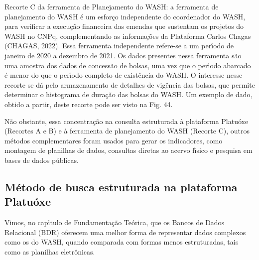 \documentclass[
12pt,		%
openright,	%
twoside,  %
a4paper,			%
chapter=TITLE,		%
english,			%
french,				%
spanish,			%
brazil				%
]{USPSC-classe/USPSC}
\begin{document}
\begin{alineas}
\item Recorte C da ferramenta de Planejamento do WASH: a ferramenta de planejamento do WASH \'e um esfor\c{c}o independente do coordenador do WASH, para verificar a execu\c{c}\~ao financeira das emendas que sustentam os projetos do WASH no CNPq, complementando as informa\c{c}\~oes da Plataforma Carlos Chagas  (CHAGAS, 2022). Essa ferramenta independente refere-se a um per\'{\i}odo de janeiro de 2020 a dezembro de 2021. Os dados presentes nessa ferramenta s\~ao uma amostra dos dados de concess\~ao de bolsas, uma vez que o per\'{\i}odo abarcado \'e menor do que o per\'{\i}odo completo de exist\^encia do WASH. O interesse nesse recorte se d\'a pelo armazenamento de detalhes de vig\^encia das bolsas, que permite determinar o histograma de dura\c{c}\~ao das bolsas do WASH. Um exemplo de dado, obtido a partir, deste recorte pode ser visto na Fig. 44.
\end{alineas}

N\~ao obstante, essa concentra\c{c}\~ao na consulta estruturada \`a plataforma Platu\'oxe (Recortes A e B) e \`a ferramenta de planejamento do WASH (Recorte C), outros m\'etodos complementares foram usados para gerar os indicadores, como montagem de planilhas de dados, consultas diretas ao acervo f\'{\i}sico e pesquisa em bases de dados p\'ublicas.

















\subsection[M\'etodo de busca estruturada na plataforma Platu\'oxe]{M\'etodo de busca estruturada na plataforma Platu\'oxe}\label{M\'etodo de busca estruturada na plataforma Platu\'oxe}
Vimos, no cap\'{\i}tulo de Fundamenta\c{c}\~ao Te\'orica, que os Bancos de Dados Relacional (BDR) oferecem uma melhor forma de representar dados complexos como os do WASH, quando comparada com formas menos estruturadas, tais como as planilhas eletr\^onicas.
\end{document}
